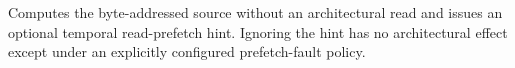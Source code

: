 Computes the byte-addressed source without an architectural read and issues an optional temporal read-prefetch hint. Ignoring the hint has no architectural effect except under an explicitly configured prefetch-fault policy.
